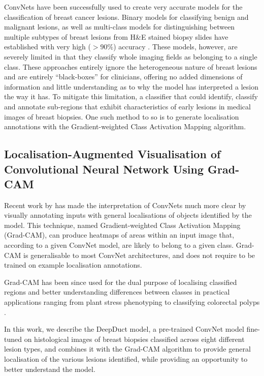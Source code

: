 ConvNets have been successfully used to create very accurate models for the classification of breast cancer lesions. Binary models for classifying benign and malignant lesions, as well as multi-class models for distinguishing between multiple subtypes of breast lesions from H\&E stained biopsy slides have established with very high ($>90\%$) accuracy \citep{wei2017, han2017}. These models, however, are severely limited in that they classify whole imaging fields as belonging to a single class. These approaches entirely ignore the heterogeneous nature of breast lesions and are entirely ``black-boxes'' for clinicians, offering no added dimensions of information and little understanding as to why the model has interpreted a lesion the way it has. To mitigate this limitation, a classifier that could identify, classify and annotate sub-regions that exhibit characteristics of early lesions in medical images of breast biopsies. One such method to so is to generate localisation annotations with the Gradient-weighted Class Activation Mapping algorithm. \par

\subsection{Localisation-Augmented Visualisation of Convolutional Neural Network Using Grad-CAM}

Recent work by \citeauthor{selvaraju2016} has made the interpretation of ConvNets much more clear by visually annotating inputs with general localisations of objects identified by the model. This technique, named Gradient-weighted Class Activation Mapping (Grad-CAM), can produce heatmaps of areas within an input image that, according to a given ConvNet model, are likely to belong to a given class. Grad-CAM is generalisable to most ConvNet architectures, and does not require to be trained on example localisation annotations.\par

Grad-CAM has been since used for the dual purpose of localising classified regions and better understanding differences between classes in practical applications ranging from plant stress phenotyping to classifying colorectal polyps \citep{ghosal2017,korbar2017}.\par

In this work, we describe the DeepDuct model, a pre-trained ConvNet model fine-tuned on histological images of breast biopsies classified across eight different lesion types, and combines it with the Grad-CAM algorithm to provide general localisation of the various lesions identified, while providing an opportunity to better understand the model.